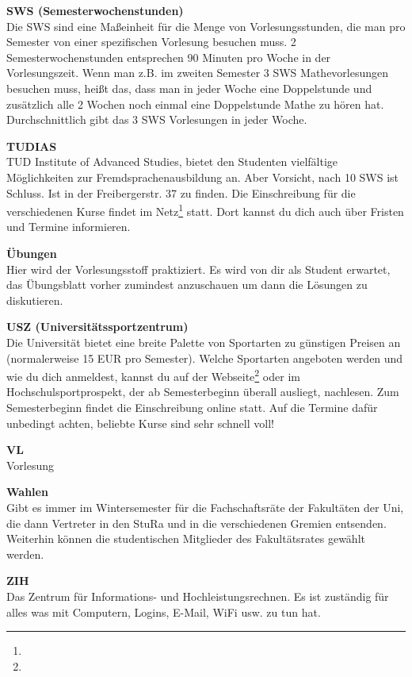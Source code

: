 \textbf{SWS (Semesterwochenstunden)} \\
Die SWS sind eine Maßeinheit für die Menge von Vorlesungsstunden, die man pro Semester von einer spezifischen Vorlesung besuchen muss.
2 Semesterwochenstunden entsprechen 90 Minuten pro Woche in der Vorlesungszeit.
Wenn man z.B. im zweiten Semester 3 SWS Mathevorlesungen besuchen muss, heißt das, dass man in jeder Woche eine Doppelstunde und zusätzlich alle 2 Wochen noch einmal eine Doppelstunde Mathe zu hören hat.
Durchschnittlich gibt das 3 SWS Vorlesungen in jeder Woche.

\textbf{TUDIAS} \\
TUD Institute of Advanced Studies, bietet den Studenten vielfältige Möglichkeiten zur Fremdsprachenausbildung an.
Aber Vorsicht, nach 10 SWS ist Schluss.
Ist in der Freibergerstr. 37 zu finden.
Die Einschreibung für die verschiedenen Kurse findet im Netz\footnote{} statt.
Dort kannst du dich auch über Fristen und Termine informieren.

\textbf{Übungen} \\
Hier wird der Vorlesungsstoff praktiziert.
Es wird von dir als Student erwartet, das Übungsblatt vorher zumindest anzuschauen um dann die Lösungen zu diskutieren.

\textbf{USZ (Universitätssportzentrum)} \\
Die Universität bietet eine breite Palette von Sportarten zu günstigen Preisen an (normalerweise 15 EUR pro Semester).
Welche Sportarten angeboten werden und wie du dich anmeldest, kannst du auf der Webseite\footnote{} oder im Hochschulsportprospekt, der ab Semesterbeginn überall ausliegt, nachlesen.
Zum Semesterbeginn findet die Einschreibung online statt.
Auf die Termine dafür unbedingt achten, beliebte Kurse sind sehr schnell voll!

\textbf{VL} \\
Vorlesung

\textbf{Wahlen} \\
Gibt es immer im Wintersemester für die Fachschaftsräte der Fakultäten der Uni, die dann Vertreter in den StuRa und in die verschiedenen Gremien entsenden.
Weiterhin können die studentischen Mitglieder des Fakultätsrates gewählt werden.

\textbf{ZIH} \\
Das Zentrum für Informations- und Hochleistungsrechnen.
Es ist zuständig für alles was mit Computern, Logins, E-Mail, WiFi usw. zu tun hat.
